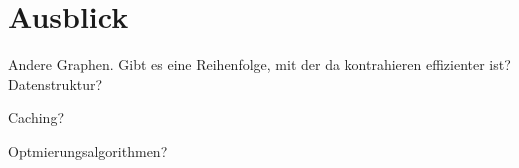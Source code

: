 \chapter{Ausblick}

Andere Graphen.
Gibt es eine Reihenfolge, mit der da kontrahieren effizienter ist?
Datenstruktur?

Caching?

Optmierungsalgorithmen?